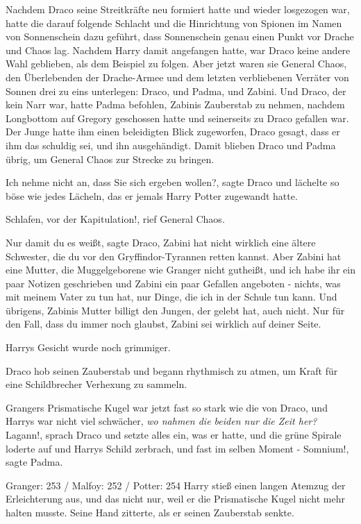 Nachdem Draco seine Streitkräfte neu formiert hatte und wieder losgezogen war,
hatte die darauf folgende Schlacht und die Hinrichtung von Spionen im Namen von
Sonnenschein dazu geführt, dass Sonnenschein genau einen Punkt vor Drache und
Chaos lag. Nachdem Harry damit angefangen hatte, war Draco keine andere Wahl
geblieben, als dem Beispiel zu folgen. Aber jetzt waren sie General Chaos, den
Überlebenden der Drache-Armee und dem letzten verbliebenen Verräter von Sonnen
drei zu eins unterlegen: Draco, und Padma, und Zabini. Und Draco, der kein Narr
war, hatte Padma befohlen, Zabinis Zauberstab zu nehmen, nachdem Longbottom auf
Gregory geschossen hatte und seinerseits zu Draco gefallen war. Der Junge hatte
ihm einen beleidigten Blick zugeworfen, Draco gesagt, dass er ihm das schuldig
sei, und ihn ausgehändigt. Damit blieben Draco und Padma übrig, um General Chaos
zur Strecke zu bringen.

\glqq{}Ich nehme nicht an, dass Sie sich ergeben wollen?\grqq{}, sagte Draco und
lächelte so böse wie jedes Lächeln, das er jemals Harry Potter zugewandt hatte.

\glqq{}Schlafen, vor der Kapitulation!\grqq{}, rief General Chaos.

\glqq{}Nur damit du es weißt\grqq{}, sagte Draco, \glqq{}Zabini hat nicht wirklich
eine ältere Schwester, die du vor den Gryffindor-Tyrannen retten kannst. Aber
Zabini hat eine Mutter, die Muggelgeborene wie Granger nicht gutheißt, und ich
habe ihr ein paar Notizen geschrieben und Zabini ein paar Gefallen angeboten -
nichts, was mit meinem Vater zu tun hat, nur Dinge, die ich in der Schule tun
kann. Und übrigens, Zabinis Mutter billigt den Jungen, der gelebt hat, auch
nicht. Nur für den Fall, dass du immer noch glaubst, Zabini sei wirklich auf
deiner Seite.\grqq{}

Harrys Gesicht wurde noch grimmiger.

Draco hob seinen Zauberstab und begann rhythmisch zu atmen, um Kraft für eine
Schildbrecher Verhexung zu sammeln.

Grangers Prismatische Kugel war jetzt fast so stark wie die von Draco, und
Harrys war nicht viel schwächer, \emph{wo nahmen die beiden nur die Zeit her?}
\glqq{}Lagann!\grqq{}, sprach Draco und setzte alles ein, was er hatte, und die
grüne Spirale loderte auf und Harrys Schild zerbrach, und fast im selben Moment
- \glqq{}Somnium!\grqq{}, sagte Padma.

Granger: 253 / Malfoy: 252 / Potter: 254 Harry stieß einen langen Atemzug der
Erleichterung aus, und das nicht nur, weil er die Prismatische Kugel nicht mehr
halten musste. Seine Hand zitterte, als er seinen Zauberstab senkte.

